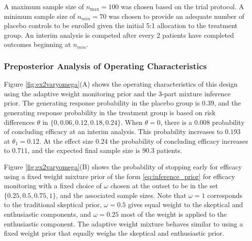 \documentclass[useAMS,usenatbib,referee]{biom}
\begin{document}
A maximum sample size of $n_{\text{max}}=100$ was chosen based on the trial protocol.
%
A minimum sample size of $n_{min}=70$ was chosen to provide an adequate number of placebo controls to be enrolled given the initial 5:1 allocation to the treatment group.
%
An interim analysis is competed after every 2 patients have completed outcomes beginning at $n_{min}$.

\subsubsection{Preposterior Analysis of Operating Characteristics}\label{sec:ex2operatingcharacteristics} 


Figure \ref{fig:ex2varyomega}(A) shows the operating characteristics of this design using the adaptive weight monitoring prior and the 3-part mixture inference prior. 
%
The generating response probability in the placebo group is 0.39, and the generating response probability in the treatment group is based on risk differences $\theta$ in $\{0, 0.06, 0.12, 0.18, 0.24\}$.
%
When $\theta=0$, there is a 0.008 probability of concluding efficacy at an interim analysis.
%
This probability increases to $0.193$ at $\theta_1=0.12$.
%
At the effect size $0.24$ the probability of concluding efficacy increases to $0.711$, and the expected final sample size is 90.3 patients.

Figure \ref{fig:ex2varyomega}(B) shows the probability of stopping early for efficacy using a fixed weight mixture prior of the form \eqref{eq:inference_prior}  for efficacy monitoring with a fixed choice of $\omega$ chosen at the outset to be in the set $\{0.25,0.5,0.75,1\}$, and the associated sample sizes.
%
Note that $\omega=1$ corresponds to the traditional skeptical prior, $\omega=0.5$ gives equal weight to the skeptical and enthusiastic components, and $\omega=0.25$ most of the weight is applied to the enthusiastic component.
%
The adaptive weight mixture behaves similar to using a fixed weight prior that equally weighs the skeptical and enthusiastic prior.
\end{document}
